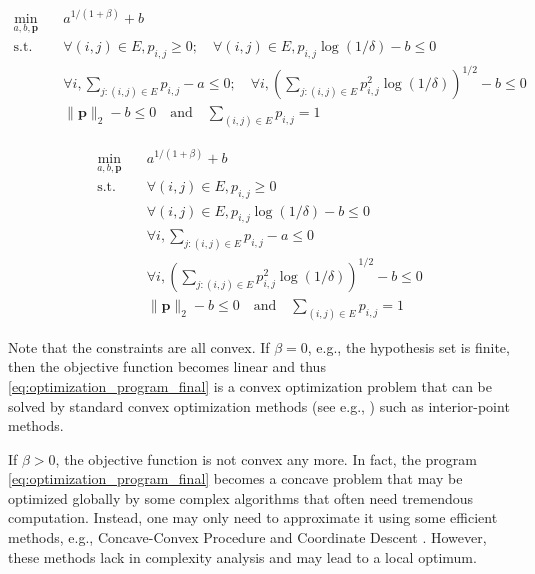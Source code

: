\documentclass[letterpaper]{article} %
\def\DoubleColumn{}
\def\DoubleColumnEnd{}
\def\SingleColumn{}
\def\SingleColumnEnd{}
\newcommand{\probdistri}{\mathbf{p}}
\newcommand{\pair}[1]{(#1)}
\newcommand{\complexbound}{\beta}
\begin{document}
\SingleColumn
\begin{equation}
    \label{eq:optimization_program_final}
\begin{aligned}
    \min_{a,b,\probdistri{}} \quad&
    a^{1/(1+\complexbound{})}+b\\
    \mbox{s.t.} \quad &\forall \pair{i,j}\in E, p_{i,j}\ge 0; \quad \forall \pair{i,j}\in E, p_{i,j}\log(1/\delta) - b \le 0\\
    & \forall i, \sum_{j:\pair{i,j}\in E} p_{i,j} -a  \le 0; \quad \forall i, \left(\sum_{j:\pair{i,j}\in E} p^2_{i,j}\log(1/\delta)\right)^{1/2} -b  \le 0\\
    & \|\probdistri{}\|_2 -b \le 0 \quad \mbox{and} \quad \sum_{\pair{i,j}\in E} p_{i,j}= 1
\end{aligned}
\end{equation}
\SingleColumnEnd
\DoubleColumn
\begin{equation}
    \label{eq:optimization_program_final}
\begin{aligned}
    \min_{a,b,\probdistri{}} \quad&
    a^{1/(1+\complexbound{})}+b\\
    \mbox{s.t.} \quad &\forall \pair{i,j}\in E, p_{i,j}\ge 0 \\
    & \forall \pair{i,j}\in E, p_{i,j}\log(1/\delta) - b \le 0\\
    & \forall i, \sum_{j:\pair{i,j}\in E} p_{i,j} -a  \le 0\\
    & \forall i, \left(\sum_{j:\pair{i,j}\in E} p^2_{i,j}\log(1/\delta)\right)^{1/2} -b  \le 0\\
    & \|\probdistri{}\|_2 -b \le 0 \quad \mbox{and} \quad \sum_{\pair{i,j}\in E} p_{i,j}= 1
\end{aligned}
\end{equation}
\DoubleColumnEnd
Note that the constraints are all convex. 
If $\complexbound{}=0$, e.g., the hypothesis set is finite, then the objective function becomes linear and thus \eqref{eq:optimization_program_final} is a convex optimization problem that can be solved by standard convex optimization methods (see e.g., \cite{boyd2004convex}) such as interior-point methods. 

If $\complexbound{}>0$, the objective function is not convex any more. In fact, the program \eqref{eq:optimization_program_final} becomes a concave problem that may be optimized globally by some complex algorithms \cite{benson1995concave,hoffman1981method} that often need tremendous computation. 
Instead, one may only need to approximate it using some efficient methods, e.g., Concave-Convex Procedure \cite{Yuille2001The} and Coordinate Descent \cite{wright2015coordinate}. 
However, these methods lack in complexity analysis and may lead to a local optimum. 
\end{document}
